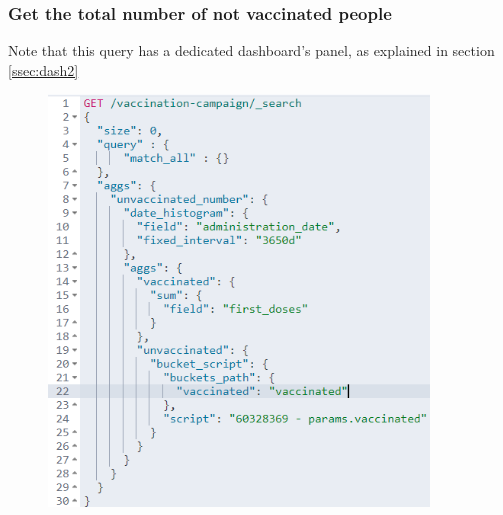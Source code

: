 \documentclass{article}[IEEEtran]
\begin{document}
\subsubsection{Get the total number of not vaccinated people}\label{ssec:q7}


Note that this query has a dedicated dashboard's panel, as explained in section \ref{ssec:dash2}

\begin{figure}[H]
\begin{center}
\begin{minipage}[b]{0.4\textwidth}
    \includegraphics[width=0.9\textwidth, frame]{Query_7.PNG}
    \subcaption{}
  \end{minipage}
  \hfill
  \begin{minipage}[b]{0.4\textwidth}

\end{minipage}
\end{center}
\end{figure}
\end{document}
